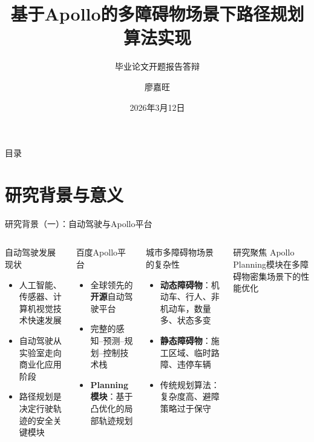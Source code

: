 \documentclass{beamer}
\title[Apollo多障碍物场景路径规划]{基于Apollo的多障碍物场景下路径规划算法实现}
\subtitle{毕业论文开题报告答辩}
\author[廖嘉旺]{廖嘉旺}
\institute[计算机工程学院]{计算机工程学院 \quad 计科2211\\[4pt]指导教师：孙成娇}
\date{2026年3月12日}
\begin{document}

\frame{\titlepage}

\begin{frame}{目录}
  \tableofcontents
\end{frame}

\section{研究背景与意义}

\begin{frame}[shrink=3]{研究背景（一）：自动驾驶与Apollo平台}
  \begin{columns}[T]
    \begin{block}{自动驾驶发展现状}
      \begin{itemize}
        \item 人工智能、传感器、计算机视觉技术快速发展
        \item 自动驾驶从实验室走向商业化应用阶段
        \item \alert{路径规划}是决定行驶轨迹的安全关键模块
      \end{itemize}
    \end{block}
    \vspace{0.1em}
    \begin{block}{百度Apollo平台}
      \begin{itemize}
        \item 全球领先的\textbf{开源}自动驾驶平台
        \item 完整的感知--预测--规划--控制技术栈
        \item \textbf{Planning模块}：基于凸优化的局部轨迹规划
      \end{itemize}
    \end{block}

    \begin{alertblock}{城市多障碍物场景的复杂性}
      \begin{itemize}
        \item \textbf{动态障碍物}：机动车、行人、非机动车，数量多、状态多变
        \item \textbf{静态障碍物}：施工区域、临时路障、违停车辆
        \item 传统规划算法：复杂度高、避障策略过于保守
      \end{itemize}
    \end{alertblock}
    \begin{exampleblock}{研究聚焦}
      Apollo Planning模块在\alert{多障碍物密集场景}下的性能优化
    \end{exampleblock}
  \end{columns}
\end{frame}
\end{document}
